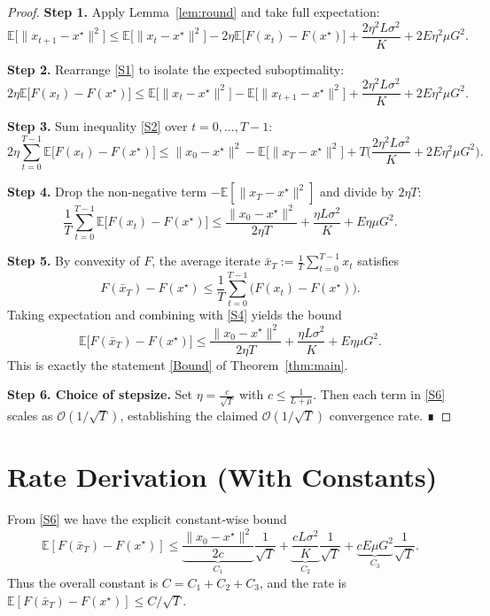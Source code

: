 \documentclass{article}
\begin{document}
\begin{proof}
\textbf{Step 1.}  Apply Lemma~\ref{lem:round} and take full expectation:
\[
\mathbb{E}\!\big[\|x_{t+1}-x^\star\|^2\big]
\le
\mathbb{E}\!\big[\|x_t-x^\star\|^2\big]
-2\eta\mathbb{E}\!\big[F(x_t)-F(x^\star)\big]
+\frac{2\eta^2L\sigma^2}{K}
+2E\eta^2\mu G^2 .
\tag{S1}
\]

\textbf{Step 2.}  Rearrange \eqref{S1} to isolate the expected suboptimality:
\[
2\eta\mathbb{E}\!\big[F(x_t)-F(x^\star)\big]
\le
\mathbb{E}\!\big[\|x_t-x^\star\|^2\big]
-\mathbb{E}\!\big[\|x_{t+1}-x^\star\|^2\big]
+\frac{2\eta^2L\sigma^2}{K}
+2E\eta^2\mu G^2 .
\tag{S2}
\]

\textbf{Step 3.}  Sum inequality \eqref{S2} over $t=0,\dots,T-1$:
\[
2\eta\sum_{t=0}^{T-1}\mathbb{E}\!\big[F(x_t)-F(x^\star)\big]
\le
\|x_0-x^\star\|^2-\mathbb{E}\!\big[\|x_T-x^\star\|^2\big]
+T\Big(\frac{2\eta^2L\sigma^2}{K}+2E\eta^2\mu G^2\Big).
\tag{S3}
\]

\textbf{Step 4.}  Drop the non‑negative term $-\mathbb{E}[\|x_T-x^\star\|^2]$ and divide by $2\eta T$:
\[
\frac1T\sum_{t=0}^{T-1}\mathbb{E}\!\big[F(x_t)-F(x^\star)\big]
\le
\frac{\|x_0-x^\star\|^2}{2\eta T}
+\frac{\eta L\sigma^2}{K}
+E\eta\mu G^2 .
\tag{S4}
\]

\textbf{Step 5.}  By convexity of $F$, the average iterate
$\bar x_T:=\frac1T\sum_{t=0}^{T-1}x_t$ satisfies
\[
F(\bar x_T)-F(x^\star)\le\frac1T\sum_{t=0}^{T-1}\big(F(x_t)-F(x^\star)\big).
\tag{S5}
\]
Taking expectation and combining with \eqref{S4} yields the bound
\[
\mathbb{E}\!\big[F(\bar x_T)-F(x^\star)\big]
\le
\frac{\|x_0-x^\star\|^2}{2\eta T}
+\frac{\eta L\sigma^2}{K}
+E\eta\mu G^2 .
\tag{S6}
\]
This is exactly the statement \eqref{Bound} of Theorem~\ref{thm:main}.

\textbf{Step 6. Choice of stepsize.}
Set $\eta = \frac{c}{\sqrt{T}}$ with $c\le\frac{1}{L+\mu}$.
Then each term in \eqref{S6} scales as $\mathcal{O}(1/\sqrt{T})$,
establishing the claimed $\mathcal{O}(1/\sqrt{T})$ convergence rate. ∎
\end{proof}

\section*{Rate Derivation (With Constants)}
From \eqref{S6} we have the explicit constant‑wise bound
\[
\mathbb{E}[F(\bar x_T)-F(x^\star)]
\le
\underbrace{\frac{\|x_0-x^\star\|^2}{2c}}_{\displaystyle C_1}
\frac{1}{\sqrt{T}}
+\underbrace{\frac{cL\sigma^2}{K}}_{\displaystyle C_2}
\frac{1}{\sqrt{T}}
+\underbrace{cE\mu G^2}_{\displaystyle C_3}
\frac{1}{\sqrt{T}}.
\]
Thus the overall constant is $C=C_1+C_2+C_3$,
and the rate is $\mathbb{E}[F(\bar x_T)-F(x^\star)]\le C/\sqrt{T}$.
\end{document}
